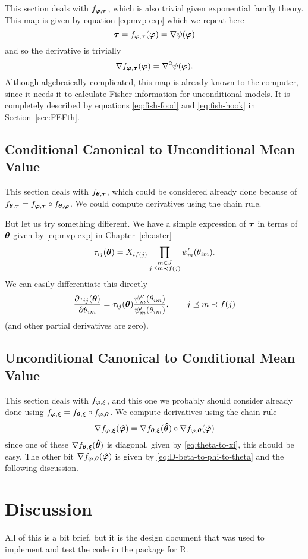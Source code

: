 This section deals with $f_{{\boldsymbol{\varphi}}, {\boldsymbol{\tau}}}$, which is also trivial
given exponential family theory.  This map is given by
equation \eqref{eq:mvp-exp} which we repeat here
$$
   {\boldsymbol{\tau}}
   =
   f_{{\boldsymbol{\varphi}}, {\boldsymbol{\tau}}}({\boldsymbol{\varphi}})
   =
   \nabla \psi({\boldsymbol{\varphi}})
$$
and so the derivative is trivially
\begin{equation} \label{eq:phi-to-tau}
   \nabla f_{{\boldsymbol{\varphi}}, {\boldsymbol{\tau}}}({\boldsymbol{\varphi}})
   =
   \nabla^2 \psi({\boldsymbol{\varphi}}).
\end{equation}
Although algebraically complicated, this map is already known to
the computer, since it needs it to calculate Fisher information
for unconditional models.  It is completely described
by equations \eqref{eq:fish-food} and \eqref{eq:fish-hook} in
Section~\ref{sec:FEFth}.

\subsection{Conditional Canonical to Unconditional Mean Value}

This section deals with $f_{{\boldsymbol{\theta}}, {\boldsymbol{\tau}}}$, which could be
considered already done because
of $f_{{\boldsymbol{\theta}}, {\boldsymbol{\tau}}}
= f_{{\boldsymbol{\varphi}}, {\boldsymbol{\tau}}} \circ f_{{\boldsymbol{\theta}}, {\boldsymbol{\varphi}}}$.
We could compute derivatives using the chain rule.

But let us try something different.  We have a simple expression of
${\boldsymbol{\tau}}$ in terms of ${\boldsymbol{\theta}}$ given by \eqref{eq:mvp-exp} in
Chapter~\ref{ch:aster}
$$
   \tau_{i j}({\boldsymbol{\theta}})
   =
   X_{i f(j)}
   \prod_{\substack{m \in J \\ j \preceq m \prec f(j)}}
   \psi_m'(\theta_{i m}).
$$
We can easily differentiate this directly
$$
   \frac{\partial  \tau_{i j}({\boldsymbol{\theta}})}{\partial \theta_{i m}}
   =
   \tau_{i j}({\boldsymbol{\theta}})
   \frac{\psi_m''(\theta_{i m})}{ \psi_m'(\theta_{i m})},
   \qquad j \preceq m \prec f(j)
$$
(and other partial derivatives are zero).

\subsection{Unconditional Canonical to Conditional Mean Value}

This section deals with $f_{{\boldsymbol{\varphi}}, {\boldsymbol{\xi}}}$, and this one
we probably should consider already done using $f_{{\boldsymbol{\varphi}}, {\boldsymbol{\xi}}}
= f_{{\boldsymbol{\theta}}, {\boldsymbol{\xi}}} \circ f_{{\boldsymbol{\varphi}}, {\boldsymbol{\theta}}}$.
We compute derivatives using the chain rule
$$
   \nabla f_{{\boldsymbol{\varphi}}, {\boldsymbol{\xi}}}({\boldsymbol{\hat{\varphi}}})
   =
   \nabla f_{{\boldsymbol{\theta}}, {\boldsymbol{\xi}}}({\boldsymbol{\hat{\theta}}})
   \circ
   \nabla f_{{\boldsymbol{\varphi}}, {\boldsymbol{\theta}}}({\boldsymbol{\hat{\varphi}}})
$$
since one of these $\nabla f_{{\boldsymbol{\theta}}, {\boldsymbol{\xi}}}({\boldsymbol{\hat{\theta}}})$
is diagonal, given by \eqref{eq:theta-to-xi}, this should be easy.
The other bit $\nabla f_{{\boldsymbol{\varphi}}, {\boldsymbol{\theta}}}({\boldsymbol{\hat{\varphi}}})$
is given by \eqref{eq:D-beta-to-phi-to-theta} and the following discussion.

\section{Discussion}

All of this is a bit brief, but it is the design document that was used
to implement and test the code in the \verb@aster@ package for R.
